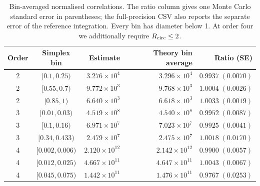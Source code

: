 \begin{table}[htbp]
\centering\small
\caption{Bin-averaged normalised correlations. The ratio column gives one Monte Carlo standard error in parentheses; the full-precision CSV also reports the separate error of the reference integration. Every bin has diameter below 1. At order four we additionally require $R_{\rm circ}\leq2$.}
\label{tab:simulation-results}
\begin{tabular}{ccrrr}
\toprule
Order & Simplex bin & Estimate & Theory bin average & Ratio (SE)\\
\midrule
2 & $[0.1, 0.25)$ & $3.276\times10^{4}$ & $3.296\times10^{4}$ & $0.9937\;(0.0070)$\\
2 & $[0.55, 0.7)$ & $9.772\times10^{3}$ & $9.768\times10^{3}$ & $1.0004\;(0.0026)$\\
2 & $[0.85, 1)$ & $6.640\times10^{3}$ & $6.618\times10^{3}$ & $1.0033\;(0.0019)$\\
3 & $[0.01, 0.03)$ & $4.519\times10^{8}$ & $4.540\times10^{8}$ & $0.9952\;(0.0087)$\\
3 & $[0.1, 0.16)$ & $6.971\times10^{7}$ & $7.023\times10^{7}$ & $0.9925\;(0.0041)$\\
3 & $[0.34, 0.433)$ & $2.479\times10^{7}$ & $2.475\times10^{7}$ & $1.0018\;(0.0170)$\\
4 & $[0.002, 0.006)$ & $2.120\times10^{12}$ & $2.142\times10^{12}$ & $0.9900\;(0.0057)$\\
4 & $[0.012, 0.025)$ & $4.667\times10^{11}$ & $4.647\times10^{11}$ & $1.0043\;(0.0067)$\\
4 & $[0.045, 0.075)$ & $1.442\times10^{11}$ & $1.476\times10^{11}$ & $0.9767\;(0.0253)$\\
\bottomrule
\end{tabular}
\end{table}
